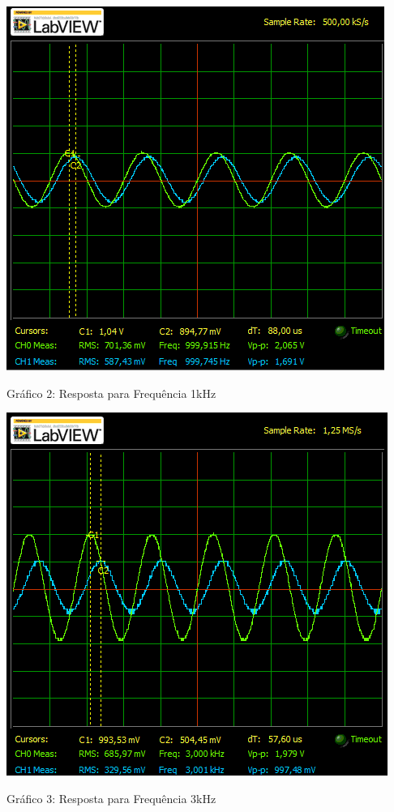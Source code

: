 \newpage\begin{table}[h]
\centering
\includegraphics[scale=0.7]{graficos/RGADICOA1}
\end{table}
\begin{center}
Gráfico 2: Resposta para Frequência 1kHz
\end{center}


\begin{table}[h]
\centering
\includegraphics[scale=0.7]{graficos/RGADICOA3}
\end{table}
\begin{center}
Gráfico 3: Resposta para Frequência 3kHz
\end{center}

